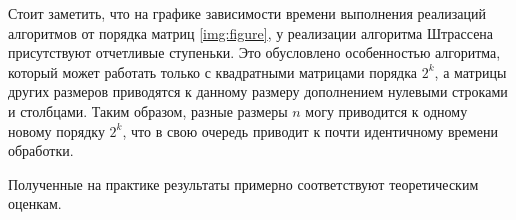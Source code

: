 Стоит заметить, что на графике зависимости времени выполнения реализаций алгоритмов от порядка матриц \ref{img:figure}, у реализации алгоритма Штрассена присутствуют отчетливые ступеньки.
Это обусловлено особенностью алгоритма, который может работать только с квадратными матрицами порядка $2^k$, а матрицы других размеров приводятся к данному размеру дополнением нулевыми строками и столбцами. 
Таким образом, разные размеры $n$ могу приводится к одному новому порядку $2^k$, что в свою очередь приводит к почти идентичному времени обработки.

Полученные на практике результаты примерно соответствуют теоретическим оценкам.